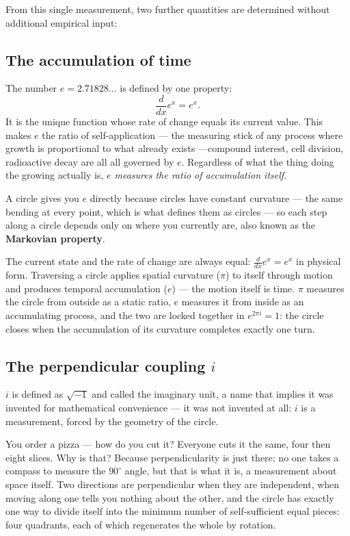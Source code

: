 \documentclass[12pt]{article}
\begin{document}
From this single measurement, two further quantities are determined without additional empirical input:

\subsection{The accumulation of time}

The number $e = 2.71828\ldots$ is defined by one property:
\[
    \frac{d}{dx}e^x = e^x.
\]
It is the unique function whose rate of change equals its current value. This makes $e$ the ratio of self-application --- the measuring stick of any process where growth is proportional to what already exists ---compound interest, cell division, radioactive decay are all all governed by $e$. Regardless of what the thing doing the growing actually is, \textit{$e$ measures the ratio of accumulation itself.}

A circle gives you $e$ directly because circles have constant curvature --- the same bending at every point, which is what defines them as circles --- so each step along a circle depends only on where you currently are, also known as the \textbf{Markovian property}.

The current state and the rate of change are always equal: $\frac{d}{dx}e^x = e^x$ in physical form. Traversing a circle applies spatial curvature ($\pi$) to itself through motion and produces temporal accumulation ($e$) --- the motion itself is time. $\pi$ measures the circle from outside as a static ratio, $e$ measures it from inside as an accumulating process, and the two are locked together in $e^{2\pi i} = 1$: the circle closes when the accumulation of its curvature completes exactly one turn.


\subsection{The perpendicular coupling $i$}

$i$ is defined as $\sqrt{-1}$ and called the imaginary unit, a name that implies it was invented for mathematical convenience --- it was not invented at all: $i$ is a measurement, forced by the geometry of the circle.

You order a pizza --- how do you cut it? Everyone cuts it the same, four then eight slices. Why is that? Because perpendicularity is just there; no one takes a compass to measure the $90^\circ$ angle, but that is what it is, a measurement about space itself. Two directions are perpendicular when they are independent, when moving along one tells you nothing about the other, and the circle has exactly one way to divide itself into the minimum number of self-sufficient equal pieces: four quadrants, each of which regenerates the whole by rotation. 
\end{document}
